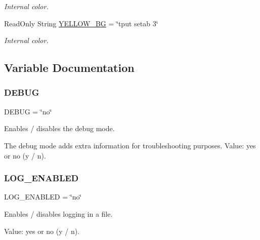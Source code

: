 \begin{DoxyCompactItemize}
\begin{DoxyCompactList}\small\item\em Internal color. \end{DoxyCompactList}\item 
\mbox{\label{bsfl_8sh_a3140ea9afffda7778f18d806583be102}} 
Read\+Only String \hyperlink{bsfl_8sh_a3140ea9afffda7778f18d806583be102}{Y\+E\+L\+L\+O\+W\+\_\+\+BG} = \char`\"{}tput setab 3\char`\"{}
\begin{DoxyCompactList}\small\item\em Internal color. \end{DoxyCompactList}\end{DoxyCompactItemize}


\subsection{Variable Documentation}
\mbox{\label{bsfl_8sh_a73585d7121de037cf2e2ca12b27eb83e}} 
\subsubsection{\texorpdfstring{D\+E\+B\+UG}{DEBUG}}
{\footnotesize\ttfamily D\+E\+B\+UG = \char`\"{}no\char`\"{}}



Enables / disables the debug mode. 

The debug mode adds extra information for troubleshooting purposes. Value\+: yes or no (y / n). \mbox{\label{bsfl_8sh_a5996d87126284ce1bb8a03f752198d11}} 
\subsubsection{\texorpdfstring{L\+O\+G\+\_\+\+E\+N\+A\+B\+L\+ED}{LOG\_ENABLED}}
{\footnotesize\ttfamily L\+O\+G\+\_\+\+E\+N\+A\+B\+L\+ED = \char`\"{}no\char`\"{}}



Enables / disables logging in a file. 

Value\+: yes or no (y / n). \mbox{\label{bsfl_8sh_a8156ebc13563ddc7be6b5fb214e861cf}} 
